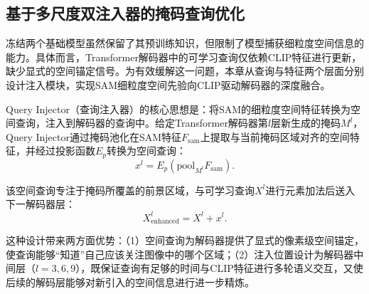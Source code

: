 


\subsection{基于多尺度双注入器的掩码查询优化}

\label{sec:chap4_dual_injector}

冻结两个基础模型虽然保留了其预训练知识，但限制了模型捕获细粒度空间信息的能力。具体而言，Transformer解码器中的可学习查询仅依赖CLIP特征进行更新，缺少显式的空间锚定信号。为有效缓解这一问题，本章从查询与特征两个层面分别设计注入模块，实现SAM细粒度空间先验向CLIP驱动解码器的深度融合。

Query Injector（查询注入器）的核心思想是：将SAM的细粒度空间特征转换为空间查询，注入到解码器的查询中。给定Transformer解码器第$l$层新生成的掩码$M^l$，Query Injector通过掩码池化在SAM特征$F_{\text{sam}}$上提取与当前掩码区域对齐的空间特征，并经过投影函数$E_p$转换为空间查询：
\begin{equation}
x^l = E_p(\mathrm{pool}_{M^l} F_{\mathrm{sam}}).
\label{eq:query_injector}
\end{equation}

该空间查询专注于掩码所覆盖的前景区域，与可学习查询$X^l$进行元素加法后送入下一解码器层：
\begin{equation}
X^l_{\text{enhanced}} = X^l + x^l.
\end{equation}

这种设计带来两方面优势：（1）空间查询为解码器提供了显式的像素级空间锚定，使查询能够“知道”自己应该关注图像中的哪个区域；（2）注入位置设计为解码器中间层（$l=3,6,9$），既保证查询有足够的时间与CLIP特征进行多轮语义交互，又使后续的解码层能够对新引入的空间信息进行进一步精炼。

